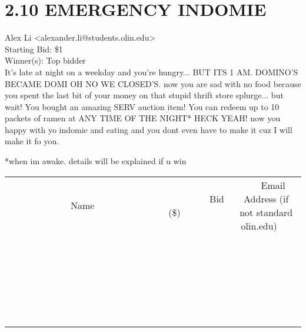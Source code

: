 \documentclass[11pt]{article}
\begin{document}
					\section*{2.10 EMERGENCY INDOMIE}
					Alex Li <alexander.li@students.olin.edu> \\
					Starting Bid: \$1 \\
					Winner(s): Top bidder \\
					It's late at night on a weekday and you're hungry... BUT ITS 1 AM. DOMINO'S BECAME DOMI OH NO WE CLOSED'S. now you are sad with no food because you spent the last bit of your money on that stupid thrift store splurge... but wait! You bought an amazing SERV auction item! You can redeem up to 10 packets of ramen at ANY TIME OF THE NIGHT*    HECK YEAH! now you happy with yo indomie and eating and you dont even have to make it cuz I will make it fo you.





*when im awake. details will be explained if u win \\
					[6ex]
					\begin{tabular}{c c c}
						~~~~~~~~~~~~~Name~~~~~~~~~~~~~ & ~~~~~~~~~Bid (\$)~~~~~~~~~ & ~~~Email Address (if not standard olin.edu)~~~ \\
				
 & & \\
\hline
 & & \\
\hline
 & & \\
\hline
 & & \\
\hline
 & & \\
\hline
 & & \\
\hline
 & & \\
\hline
 & & \\
\hline
 & & \\
\hline
 & & \\
\hline
 & & \\
\hline
 & & \\
\hline
 & & \\
\hline
 & & \\
\hline
 & & \\
\hline
 & & \\
\hline
 & & \\
\hline
 & & \\
\hline
 & & \\
\hline
 & & \\
\hline
 & & \\
\hline
 & & \\
\hline
 & & \\
\hline
 & & \\
\hline
 & & \\
\hline
 & & \\
\hline
					\end{tabular}
					\clearpage
				
\end{document}
